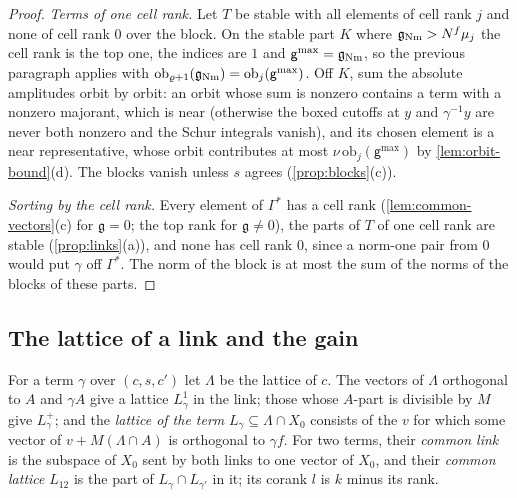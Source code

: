 \begin{proof}
\emph{Terms of one cell rank.} Let $T$ be stable with all elements of cell rank $j$ and none of cell rank $0$ over the block. On the stable part $K$ where $\mathfrak g_{\rm Nm}>N^f\mu_j$ the cell rank is the top one,
the indices are $1$ and $\mathsf g^{\max}=\mathfrak g_{\rm Nm}$, so the previous paragraph applies with $\mathrm{ob}_{\varrho+1}(\mathfrak g_{\rm Nm})=\mathrm{ob}_j(\mathsf g^{\max})$. Off $K$, sum the absolute amplitudes orbit by orbit: an orbit
whose sum is nonzero contains a term with a nonzero majorant, which is near (otherwise the boxed cutoffs at $y$ and $\gamma^{-1}y$ are never both nonzero and the Schur integrals vanish), and its chosen element is a near
representative, whose orbit contributes at most $\nu\,\mathrm{ob}_j(\mathsf g^{\max})$ by \cref{lem:orbit-bound}(d). The blocks vanish unless $s$ agrees (\cref{prop:blocks}(c)).

\emph{Sorting by the cell rank.} Every element of $\Gamma^*$ has a cell rank (\cref{lem:common-vectors}(c) for $\mathfrak g=0$; the top rank for $\mathfrak g\ne0$), the parts of $T$ of one cell rank are stable (\cref{prop:links}(a)), and
none has cell rank $0$, since a norm-one pair from $0$ would put $\gamma$ off $\Gamma^*$. The norm of the block is at most the sum of the norms of the blocks of these parts.
\end{proof}

\subsection{The lattice of a link and the gain}\label{ss:gain}
For a term $\gamma$ over $(c,s,c')$ let $\Lambda$ be the lattice of $c$. The vectors of $\Lambda$ orthogonal to $A$ and $\gamma A$ give a lattice $L^1_\gamma$ in the link; those whose $A$-part is divisible by $M$ give
$L^+_\gamma$; and the \emph{lattice of the term} $L_\gamma\subseteq\Lambda\cap X_0$ consists of the $v$ for which some vector of $v+M(\Lambda\cap A)$ is orthogonal to $\gamma f$. For two terms, their \emph{common link} is the
subspace of $X_0$ sent by both links to one vector of $X_0$, and their \emph{common lattice} $L_{12}$ is the part of $L_\gamma\cap L_{\gamma'}$ in it; its corank $l$ is $k$ minus its rank.

